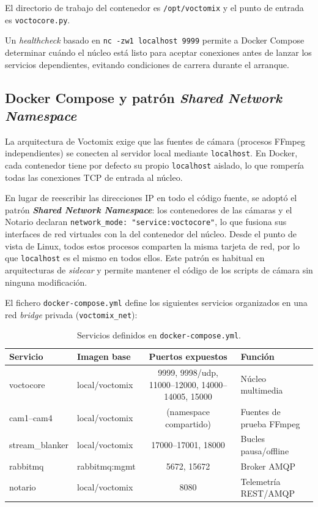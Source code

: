 El directorio de trabajo del contenedor es \texttt{/opt/voctomix} y el punto de
entrada es \texttt{voctocore.py}.

Un \textit{healthcheck} basado en \texttt{nc -zw1 localhost 9999} permite a Docker
Compose determinar cuándo el núcleo está listo para aceptar conexiones antes de lanzar
los servicios dependientes, evitando condiciones de carrera durante el arranque.

\subsection{Docker Compose y patrón \textit{Shared Network Namespace}}
\label{sec:docker_compose}

La arquitectura de Voctomix exige que las fuentes de cámara (procesos FFmpeg
independientes) se conecten al servidor local mediante \texttt{localhost}. En Docker,
cada contenedor tiene por defecto su propio \texttt{localhost} aislado, lo que rompería
todas las conexiones TCP de entrada al núcleo.

En lugar de reescribir las direcciones IP en todo el código fuente, se adoptó el patrón
\textbf{\textit{Shared Network Namespace}}: los contenedores de las cámaras y el Notario
declaran \texttt{network\_mode: "service:voctocore"}, lo que fusiona sus interfaces de
red virtuales con la del contenedor del núcleo. Desde el punto de vista de Linux, todos
estos procesos comparten la misma tarjeta de red, por lo que \texttt{localhost} es el
mismo en todos ellos. Este patrón es habitual en arquitecturas de \textit{sidecar} y
permite mantener el código de los scripts de cámara sin ninguna modificación.

El fichero \texttt{docker-compose.yml} define los siguientes servicios organizados en
una red \textit{bridge} privada (\texttt{voctomix\_net}):

\begin{table}[H]
  \centering
  \caption{Servicios definidos en \texttt{docker-compose.yml}.}
  \label{tab:servicios_docker}
  \begin{tabular}{|l|l|c|l|}
    \hline
    \textbf{Servicio} & \textbf{Imagen base} & \textbf{Puertos expuestos} & \textbf{Función} \\
    \hline
    voctocore      & local/voctomix & 9999, 9998/udp, 11000--12000, 14000--14005, 15000 & Núcleo multimedia \\
    cam1--cam4     & local/voctomix & (namespace compartido) & Fuentes de prueba FFmpeg \\
    stream\_blanker& local/voctomix & 17000--17001, 18000 & Bucles pausa/offline \\
    rabbitmq       & rabbitmq:mgmt  & 5672, 15672 & Broker AMQP \\
    notario        & local/voctomix & 8080 & Telemetría REST/AMQP \\
    \hline
  \end{tabular}
\end{table}

